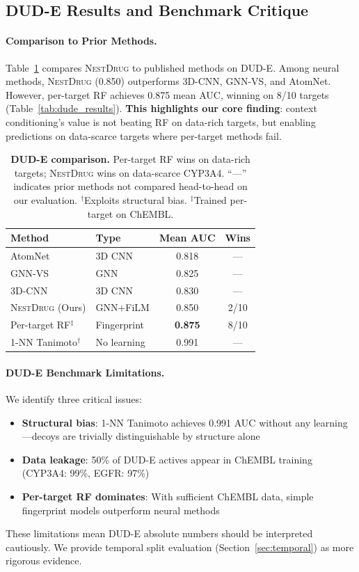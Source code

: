 \documentclass[sigconf]{acmart}
\newcommand{\methodname}{\textsc{NestDrug}}
\begin{document}
\subsection{DUD-E Results and Benchmark Critique}

\paragraph{Comparison to Prior Methods.} Table~\ref{tab:sota} compares \methodname{} to published methods on DUD-E. Among neural methods, \methodname{} (0.850) outperforms 3D-CNN, GNN-VS, and AtomNet. However, per-target RF achieves 0.875 mean AUC, winning on 8/10 targets (Table~\ref{tab:dude_results}). \textbf{This highlights our core finding}: context conditioning's value is not beating RF on data-rich targets, but enabling predictions on data-scarce targets where per-target methods fail.

\begin{table}[t]
\caption{\textbf{DUD-E comparison.} Per-target RF wins on data-rich targets; \methodname{} wins on data-scarce CYP3A4. ``---'' indicates prior methods not compared head-to-head on our evaluation. $^\dagger$Exploits structural bias. $^\ddagger$Trained per-target on ChEMBL.}
\label{tab:sota}
\centering
\small
\begin{tabular}{@{}llcc@{}}
\toprule
\textbf{Method} & \textbf{Type} & \textbf{Mean AUC} & \textbf{Wins} \\
\midrule
AtomNet~\cite{wallach_2015_atomnet} & 3D CNN & 0.818 & --- \\
GNN-VS~\cite{lim_2019_gnn_vs} & GNN & 0.825 & --- \\
3D-CNN~\cite{ragoza_2017_3dcnn} & 3D CNN & 0.830 & --- \\
\methodname{} (Ours) & GNN+FiLM & 0.850 & 2/10 \\
Per-target RF$^\ddagger$ & Fingerprint & \textbf{0.875} & 8/10 \\
\midrule
1-NN Tanimoto$^\dagger$ & No learning & 0.991 & --- \\
\bottomrule
\end{tabular}
\end{table}

\paragraph{DUD-E Benchmark Limitations.} We identify three critical issues:
\begin{itemize}[noitemsep,topsep=0pt]
\item \textbf{Structural bias}: 1-NN Tanimoto achieves 0.991 AUC without any learning---decoys are trivially distinguishable by structure alone~\cite{wallach_2018_dude_bias}
\item \textbf{Data leakage}: 50\% of DUD-E actives appear in ChEMBL training (CYP3A4: 99\%, EGFR: 97\%)
\item \textbf{Per-target RF dominates}: With sufficient ChEMBL data, simple fingerprint models outperform neural methods
\end{itemize}
These limitations mean DUD-E absolute numbers should be interpreted cautiously. We provide temporal split evaluation (Section~\ref{sec:temporal}) as more rigorous evidence.
\end{document}
